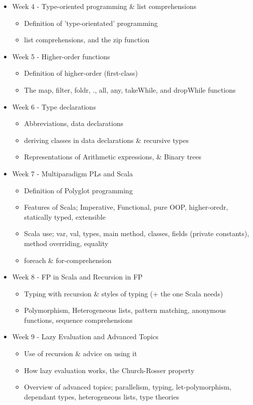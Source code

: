 \documentclass[tikz,border=10pt]{project_plan}
\begin{document}
\begin{itemize}
\begin{itemize}
        \end{itemize}
  \item Week 4 - Type-oriented programming \& list comprehensions
        \begin{itemize}
          \item Definition of 'type-orientated' programming
          \item list comprehensions, and the zip function
        \end{itemize}
  \item Week 5 - Higher-order functions
        \begin{itemize}
          \item Definition of higher-order (first-class)
          \item The map, filter, foldr, ., all, any, takeWhile, and dropWhile functions
        \end{itemize}
  \item Week 6 - Type declarations
        \begin{itemize}
          \item Abbreviations, data declarations
          \item deriving classes in data declarations \& recursive types
          \item Representations of Arithmetic expressions, \& Binary trees
        \end{itemize}
  \item Week 7 - Multiparadigm PLs and Scala
        \begin{itemize}
          \item Definition of Polyglot programming
          \item Features of Scala; Imperative, Functional, pure OOP, higher-oredr, statically typed, extensible
          \item Scala use; var, val, types, main method, classes, fields (private constants), method overriding, equality
          \item foreach \& for-comprehension
        \end{itemize}
  \item Week 8 - FP in Scala and Recursion in FP
        \begin{itemize}
          \item Typing with recursion \& styles of typing (+ the one Scala needs)
          \item Polymorphism, Heterogeneous lists, pattern matching, anonymous functions, sequence comprehensions
        \end{itemize}
  \item Week 9 - Lazy Evaluation and Advanced Topics
        \begin{itemize}
          \item Use of recursion \& advice on using it
          \item How lazy evaluation works, the Church-Rosser property
          \item Overview of advanced topics; parallelism, typing, let-polymorphism, dependant types, heterogeneous lists, type theories
        \end{itemize}
\end{itemize}
\end{document}
